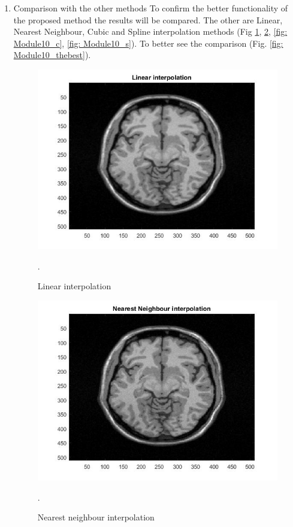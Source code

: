 \begin{enumerate}
\item Comparison with the other methods
\newline To confirm the better functionality of the proposed method the results will be compared. The other are Linear, Nearest Neighbour, Cubic and Spline interpolation methods (Fig \ref{fig: Module10_l}, \ref{fig: Module10_NN}, \ref{fig: Module10_c}, \ref{fig: Module10_s}). To better see the comparison (Fig. \ref{fig: Module10_thebest}).

\begin{figure}[H]
\centering{}\includegraphics[scale=0.4]{figures/Module_10/Module_10_l}\caption{Linear interpolation}. 
\label{fig: Module10_l}
\end{figure}

\begin{figure}[H]
\centering{}\includegraphics[scale=0.4]{figures/Module_10/Module_10_NN}\caption{Nearest neighbour interpolation}. 
\label{fig: Module10_NN}
\end{figure}


\end{enumerate}
